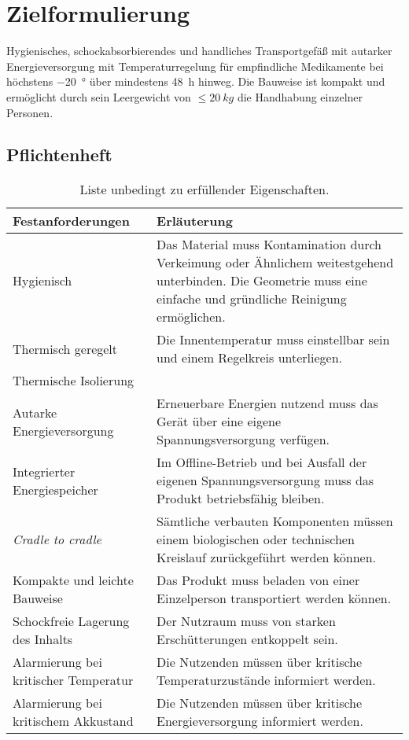 \chapter{Zielformulierung}
	Hygienisches, schockabsorbierendes und handliches Transportgefäß mit autarker Energieversorgung mit Temperaturregelung für empfindliche
	Medikamente bei höchstens \SI{-20}{\degree} über mindestens \SI{48}{h} hinweg. Die Bauweise ist kompakt und ermöglicht durch sein
	Leergewicht von \(\leq \SI{20}{kg}\) die Handhabung einzelner Personen.
	\section{Pflichtenheft}
		\begin{table}[h]
			\centering
			\caption{Liste unbedingt zu erfüllender Eigenschaften.}
			\begin{tabular}{@{}p{.49\textwidth}p{}@{}}
				\toprule
				\textbf{Festanforderungen} 						& \textbf{Erläuterung} \\
				\midrule
				Hygienisch										& Das Material muss Kontamination durch Verkeimung
																oder Ähnlichem weitestgehend unterbinden. Die Geometrie muss eine einfache und gründliche Reinigung ermöglichen.\\
				Thermisch geregelt								& Die Innentemperatur muss einstellbar sein und einem Regelkreis unterliegen.\\
				Thermische Isolierung							& \\
				Autarke Energieversorgung						& Erneuerbare Energien nutzend muss das Gerät über eine eigene Spannungsversorgung verfügen.\\
				Integrierter Energiespeicher					& Im Offline-Betrieb und bei Ausfall der eigenen Spannungsversorgung muss das Produkt betriebsfähig bleiben.\\
				\textit{Cradle to cradle}						& Sämtliche verbauten Komponenten müssen einem biologischen oder technischen Kreislauf zurückgeführt werden können.\\
				Kompakte und leichte Bauweise 					& Das Produkt muss beladen von einer Einzelperson transportiert werden können.\\
				Schockfreie Lagerung des Inhalts 				& Der Nutzraum muss von starken Erschütterungen entkoppelt sein.\\
				Alarmierung bei kritischer Temperatur			& Die Nutzenden müssen über kritische Temperaturzustände informiert werden.\\
				Alarmierung bei kritischem Akkustand			& Die Nutzenden müssen über kritische Energieversorgung informiert werden.\\
				\bottomrule
			\end{tabular}
		\end{table}
